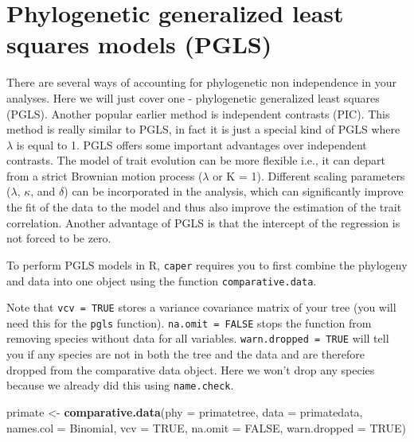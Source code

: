 \documentclass[]{book}
\newenvironment{Shaded}{\begin{snugshade}}{\end{snugshade}}
\newcommand{\KeywordTok}[1]{\textcolor[rgb]{0.13,0.29,0.53}{\textbf{{#1}}}}
\newcommand{\DataTypeTok}[1]{\textcolor[rgb]{0.13,0.29,0.53}{{#1}}}
\newcommand{\StringTok}[1]{\textcolor[rgb]{0.31,0.60,0.02}{{#1}}}
\newcommand{\OtherTok}[1]{\textcolor[rgb]{0.56,0.35,0.01}{{#1}}}
\newcommand{\NormalTok}[1]{{#1}}
\begin{document}
\section{Phylogenetic generalized least squares models
(PGLS)}\label{phylogenetic-generalized-least-squares-models-pgls}

There are several ways of accounting for phylogenetic non independence
in your analyses. Here we will just cover one - phylogenetic generalized
least squares (PGLS). Another popular earlier method is independent
contrasts (PIC). This method is really similar to PGLS, in fact it is
just a special kind of PGLS where \(\lambda\) is equal to 1. PGLS offers
some important advantages over independent contrasts. The model of trait
evolution can be more flexible i.e., it can depart from a strict
Brownian motion process (\(\lambda\) or K = 1). Different scaling
parameters (\(\lambda\), \(\kappa\), and \(\delta\)) can be incorporated
in the analysis, which can significantly improve the fit of the data to
the model and thus also improve the estimation of the trait correlation.
Another advantage of PGLS is that the intercept of the regression is not
forced to be zero.

To perform PGLS models in R, \texttt{caper} requires you to first
combine the phylogeny and data into one object using the function
\texttt{comparative.data}.

Note that \texttt{vcv\ =\ TRUE} stores a variance covariance matrix of
your tree (you will need this for the \texttt{pgls} function).
\texttt{na.omit\ =\ FALSE} stops the function from removing species
without data for all variables. \texttt{warn.dropped\ =\ TRUE} will tell
you if any species are not in both the tree and the data and are
therefore dropped from the comparative data object. Here we won't drop
any species because we already did this using \texttt{name.check}.

\begin{Shaded}
\begin{Highlighting}[]
\NormalTok{primate <-}\StringTok{ }\KeywordTok{comparative.data}\NormalTok{(}\DataTypeTok{phy =} \NormalTok{primatetree, }\DataTypeTok{data =} \NormalTok{primatedata, }
                            \DataTypeTok{names.col =} \NormalTok{Binomial, }\DataTypeTok{vcv =} \OtherTok{TRUE}\NormalTok{, }
                            \DataTypeTok{na.omit =} \OtherTok{FALSE}\NormalTok{, }\DataTypeTok{warn.dropped =} \OtherTok{TRUE}\NormalTok{)}
\end{Highlighting}
\end{Shaded}
\end{document}
